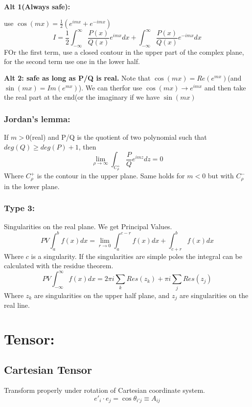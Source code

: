 \documentclass[a4paper,norsk, 10pt]{article}
\begin{document}
\textbf{Alt 1(Always safe):}

use $\cos(mx) = \frac{1}{2}(e^{imx} + e^{-imx})$
\begin{equation}
I = \frac{1}{2}\int_{-\infty}^{\infty} \frac{P(x)}{Q(x)}e^{imx}dx + \int_{-\infty}^{\infty} \frac{P(x)}{Q(x)}e^{-imx}dx
\end{equation}
FOr the first term, use a closed contour in the upper part of the complex plane, for the second term use one in the lower half.

\textbf{Alt 2: safe as long as P/Q is real.}
Note that $\cos(mx) = Re (e^{mx})$(and $\sin(mx) = Im (e^{mx})$). We can therfor use $\cos(mx) \rightarrow e^{imx}$ and then take the real part at the end(or the imaginary if we have $\sin(mx)$

\subsubsection{Jordan's lemma:}
If $m>0$(real) and P/Q is the quotient of two polynomial such that $deg(Q) \geq deg(P) + 1$, then
\begin{equation}
\lim_{\rho\rightarrow \infty}\int_{C_{\rho}^+}\frac{P}{Q}e^{imz}dz = 0
\end{equation}
Where $C_{\rho}^+$ is the contour in the upper plane. Same holds for $m<0$ but with $C_{\rho}^-$ in the lower plane.

\subsubsection{Type 3:}
Singularities on the real plane. We get Principal Values.
\begin{equation}
PV\int_a^b f(x) dx = \lim_{r\rightarrow 0}\int_a^{c-r}f(x) dx + \int_{c+r}^b f(x) dx
\end{equation}
Where $c$ is a singularity. If the singularities are simple poles the integral can be calculated with the residue theorem.
\begin{equation}
PV\int_{-\infty}^{\infty}f(x)dx = 2\pi i\sum_k Res(z_k) + \pi i \sum_j Res(z_j)
\end{equation}
Where $z_k$ are singularities on the upper half plane, and $z_j$ are singularities on the real line.

\section{Tensor:}
\subsection{Cartesian Tensor}
Transform properly under rotation of Cartesian coordinate system.
\begin{equation}
e'_i\cdot e_j = \cos\theta_{i'j} \equiv A_{ij}
\end{equation}
\end{document}
